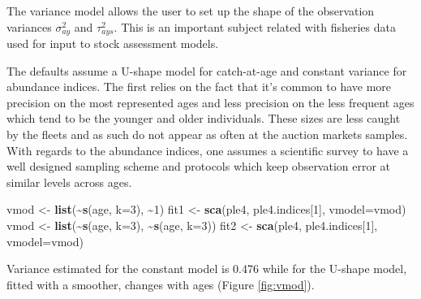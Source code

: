 \documentclass[
]{book}
\newenvironment{Shaded}{\begin{snugshade}}{\end{snugshade}}
\newcommand{\AttributeTok}[1]{\textcolor[rgb]{0.13,0.29,0.53}{#1}}
\newcommand{\DecValTok}[1]{\textcolor[rgb]{0.00,0.00,0.81}{#1}}
\newcommand{\FunctionTok}[1]{\textcolor[rgb]{0.13,0.29,0.53}{\textbf{#1}}}
\newcommand{\NormalTok}[1]{#1}
\newcommand{\OtherTok}[1]{\textcolor[rgb]{0.56,0.35,0.01}{#1}}
\newcommand{\SpecialCharTok}[1]{\textcolor[rgb]{0.81,0.36,0.00}{\textbf{#1}}}
\newcommand{\StringTok}[1]{\textcolor[rgb]{0.31,0.60,0.02}{#1}}
\begin{document}
The variance model allows the user to set up the shape of the observation variances \(\sigma^2_{ay}\) and \(\tau^2_{ays}\). This is an important subject related with fisheries data used for input to stock assessment models.

The defaults assume a U-shape model for catch-at-age and constant variance for abundance indices. The first relies on the fact that it's common to have more precision on the most represented ages and less precision on the less frequent ages which tend to be the younger and older individuals. These sizes are less caught by the fleets and as such do not appear as often at the auction markets samples. With regards to the abundance indices, one assumes a scientific survey to have a well designed sampling scheme and protocols which keep observation error at similar levels across ages.

\begin{Shaded}
\begin{Highlighting}[]
\NormalTok{vmod }\OtherTok{\textless{}{-}} \FunctionTok{list}\NormalTok{(}\SpecialCharTok{\textasciitilde{}}\FunctionTok{s}\NormalTok{(age, }\AttributeTok{k=}\DecValTok{3}\NormalTok{), }\SpecialCharTok{\textasciitilde{}}\DecValTok{1}\NormalTok{)}
\NormalTok{fit1 }\OtherTok{\textless{}{-}} \FunctionTok{sca}\NormalTok{(ple4, ple4.indices[}\DecValTok{1}\NormalTok{], }\AttributeTok{vmodel=}\NormalTok{vmod)}
\NormalTok{vmod }\OtherTok{\textless{}{-}} \FunctionTok{list}\NormalTok{(}\SpecialCharTok{\textasciitilde{}}\FunctionTok{s}\NormalTok{(age, }\AttributeTok{k=}\DecValTok{3}\NormalTok{), }\SpecialCharTok{\textasciitilde{}}\FunctionTok{s}\NormalTok{(age, }\AttributeTok{k=}\DecValTok{3}\NormalTok{))}
\NormalTok{fit2 }\OtherTok{\textless{}{-}} \FunctionTok{sca}\NormalTok{(ple4, ple4.indices[}\DecValTok{1}\NormalTok{], }\AttributeTok{vmodel=}\NormalTok{vmod)}
\end{Highlighting}
\end{Shaded}

Variance estimated for the constant model is 0.476 while for the U-shape model, fitted with a smoother, changes with ages (Figure \ref{fig:vmod}).

\begin{Shaded}
\end{Shaded}
\end{document}
